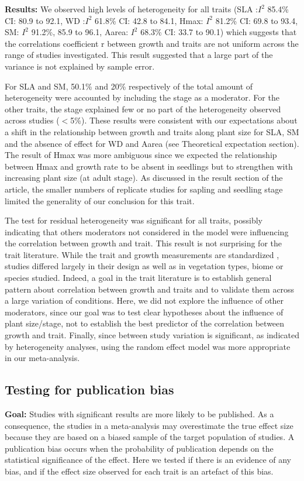 \documentclass[a4paper,11pt]{article}
\begin{document}
\begin{appendices}
\textbf{Results:} We observed high levels of heterogeneity for all traits (SLA :$I^{2}$ 85.4\% CI: 80.9 to 92.1, WD :$I^{2}$ 61.8\% CI: 42.8 to 84.1, Hmax: $I^{2}$ 81.2\% CI: 69.8 to 93.4, SM: $I^{2}$ 91.2\%, 85.9 to 96.1, Aarea: $I^{2}$ 68.3\% CI: 33.7 to 90.1) which suggests that the correlations coefficient r between growth and traits are not uniform across the range of studies investigated. This result suggested that a large part of the variance is not explained by sample error.

For SLA and SM, 50.1\% and 20\% respectively of the total amount of heterogeneity were accounted by including the stage as a moderator. For the other traits, the stage explained few or no part of the heterogeneity observed across studies ($<$5\%). These results were consistent with our expectations about a shift in the relationship between growth and traits along plant size for SLA, SM and the absence of effect for WD and Aarea (see Theoretical expectation section). The result of Hmax was more ambiguous since we expected the relationship between Hmax and growth rate to be absent in seedlings but to strengthen with increasing plant size (at adult stage). As discussed in the result section of the article, the smaller numbers of replicate studies for sapling and seedling stage limited the generality of our conclusion for this trait.

The test for residual heterogeneity was significant for all traits, possibly indicating that others moderators not considered in the model were influencing the correlation between growth and trait. This result is not surprising for the trait literature. While the trait and growth measurements are standardized \citep{Cornelissen:2003gw}, studies differed largely in their design as well as in vegetation types, biome or species studied. Indeed, a goal in the trait literature is to establish general pattern about correlation between growth and traits and to validate them across a large variation of conditions. Here, we did not explore the influence of other moderators, since our goal was to test clear hypotheses about the influence of plant size/stage, not to establish the best predictor of the correlation between growth and trait. Finally, since between study variation is significant, as indicated by heterogeneity analyses, using the random effect model was more appropriate in our meta-analysis.

\subsection{Testing for publication bias}
\textbf{Goal:} Studies with significant results are more likely to be published. As a consequence, the studies in a meta-analysis may overestimate the true effect size because they are based on a biased sample of the target population of studies. A publication bias occurs when the probability of publication depends on the statistical significance of the effect. Here we tested if there is an evidence of any bias, and if the effect size observed for each trait is an artefact of this bias.


\end{appendices}
\end{document}
